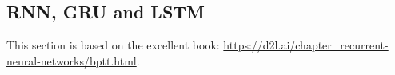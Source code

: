 \subsection{RNN, GRU and LSTM}
This section is based on the excellent book: \url{https://d2l.ai/chapter_recurrent-neural-networks/bptt.html}.
